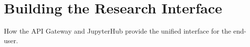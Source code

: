 \section{Building the Research Interface}

How the API Gateway and JupyterHub provide the unified interface for the end-user.
